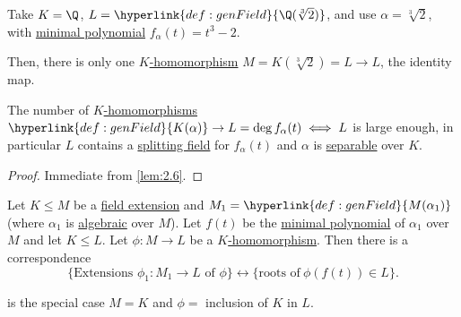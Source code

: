 \documentclass{article}
\begin{document}

\begin{eg}
    Take $K = \Q$, $L = \hyperlink{def:genField}{\Q(\sqrt[3]{2})}$, and use $\alpha = \sqrt[3]{2}$, with \hyperlink{def:minimalPoly}{minimal polynomial} $f_\alpha(t) = t^3 - 2$.

    Then, there is only one \hyperlink{def:homo}{$K$-homomorphism} $M = K(\sqrt[3]{2})  =L \to L$, the identity map.
\end{eg}

\begin{ncor}\label{cor:2.7}
    The number of \hyperlink{def:homo}{$K$-homomorphisms} $\hyperlink{def:genField}{K(\alpha)} \to L = \deg f_\alpha(t) \iff L$ is large enough, in particular $L$ contains a \hyperlink{def:splitting}{splitting field} for $f_\alpha(t)$ and $\alpha$ is \hyperlink{def:separableExt}{separable} over $K$.
\end{ncor}

\begin{proof}
    Immediate from \cref{lem:2.6}.
\end{proof}

\begin{nlemma}\label{lem:2.8}
    Let $K \leq M$ be a \hyperlink{def:fieldExt}{field extension} and $M_1 = \hyperlink{def:genField}{M(\alpha_1)}$ (where $\alpha_1$ is \hyperlink{def:algebraic}{algebraic} over $M$).
    Let $f(t)$ be the \hyperlink{def:minimalPoly}{minimal polynomial} of $\alpha_1$ over $M$ and let $K \leq L$.
    Let $\phi: M \to L$ be a \hyperlink{def:homo}{$K$-homomorphism}. Then there is a correspondence
    \begin{equation*}
        \{\text{Extensions } \phi_1:M_1 \to L \text{ of } \phi\} \longleftrightarrow \{\text{roots of} \ \phi(f(t)) \in L\}.
    \end{equation*}
    \begin{center}
    \end{center}
\end{nlemma}

\begin{remark}
     is the special case $M=K$ and $\phi =$ inclusion of $K$ in $L$.
\end{remark}
\end{document}
